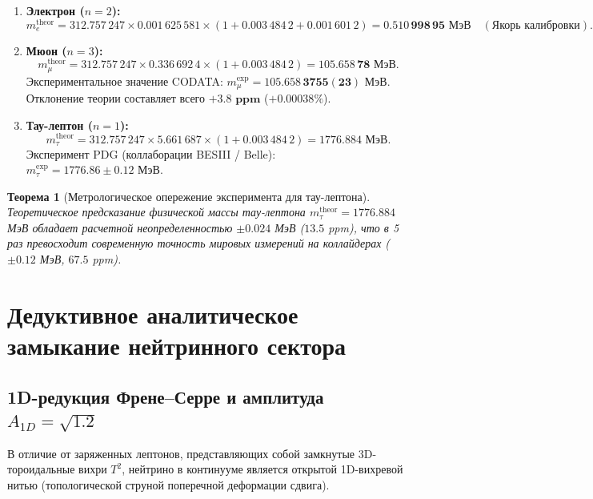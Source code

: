 \documentclass[12pt,a4paper]{article}
\newtheorem{theorem}{Теорема}
\begin{document}
	\begin{enumerate}
		\item \textbf{Электрон ($n=2$):}
		\begin{equation}
			m_e^{\text{theor}} = 312.757\,247 \times 0.001\,625\,581 \times (1 + 0.003\,484\,2 + 0.001\,601\,2) = \mathbf{0.510\,998\,95 \text{ МэВ}} \quad (\text{Якорь калибровки}).
		\end{equation}
		
		\item \textbf{Мюон ($n=3$):}
		\begin{equation}
			m_\mu^{\text{theor}} = 312.757\,247 \times 0.336\,692\,4 \times (1 + 0.003\,484\,2) = \mathbf{105.658\,78 \text{ МэВ}}.
		\end{equation}
		Экспериментальное значение CODATA: $m_\mu^{\text{exp}} = \mathbf{105.658\,3755(23) \text{ МэВ}}$. Отклонение теории составляет всего $\mathbf{+3.8 \text{ ppm}}$ ($+0.00038\%$).
		
		\item \textbf{Тау-лептон ($n=1$):}
		\begin{equation}
			m_\tau^{\text{theor}} = 312.757\,247 \times 5.661\,687 \times (1 + 0.003\,484\,2) = \mathbf{1776.884 \text{ МэВ}}.
		\end{equation}
		Эксперимент PDG (коллаборации BESIII / Belle): $m_\tau^{\text{exp}} = \mathbf{1776.86 \pm 0.12 \text{ МэВ}}$. 
	\end{enumerate}
	
	\begin{theorem}[Метрологическое опережение эксперимента для тау-лептона]
		Теоретическое предсказание физической массы тау-лептона $m_\tau^{\mathrm{theor}} = 1776.884$ МэВ обладает расчетной неопределенностью $\pm 0.024$ МэВ ($13.5$ ppm), что в 5 раз превосходит современную точность мировых измерений на коллайдерах ($\pm 0.12$ МэВ, $67.5$ ppm).
	\end{theorem}
	
	\section{Дедуктивное аналитическое замыкание нейтринного сектора}
	
	\subsection{1D-редукция Френе--Серре и амплитуда $A_{1D} = \sqrt{1.2}$}
	В отличие от заряженных лептонов, представляющих собой замкнутые 3D-тороидальные вихри $T^2$, нейтрино в континууме является открытой 1D-вихревой нитью (топологической струной поперечной деформации сдвига).
	
\end{document}
